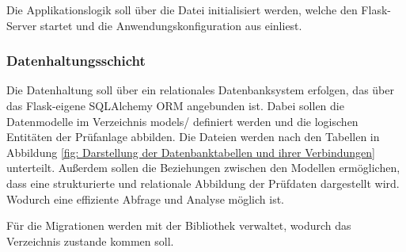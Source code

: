 Die Applikationslogik soll über die Datei  initialisiert werden, welche den Flask-Server startet und die Anwendungskonfiguration aus  einliest.


\subsubsection{Datenhaltungsschicht}

Die Datenhaltung soll über ein relationales Datenbanksystem erfolgen, das über das Flask-eigene SQLAlchemy \ac{ORM} angebunden ist.
Dabei sollen die Datenmodelle im Verzeichnis models/ definiert werden und die logischen Entitäten der Prüfanlage abbilden.
Die Dateien werden nach den Tabellen in Abbildung \ref{fig: Darstellung der Datenbanktabellen und ihrer Verbindungen} unterteilt.
Außerdem sollen die Beziehungen zwischen den Modellen ermöglichen, dass eine strukturierte und relationale Abbildung der Prüfdaten dargestellt wird.
Wodurch eine effiziente Abfrage und Analyse möglich ist.

Für die Migrationen werden mit der Bibliothek  verwaltet, wodurch das Verzeichnis  zustande kommen soll.






























